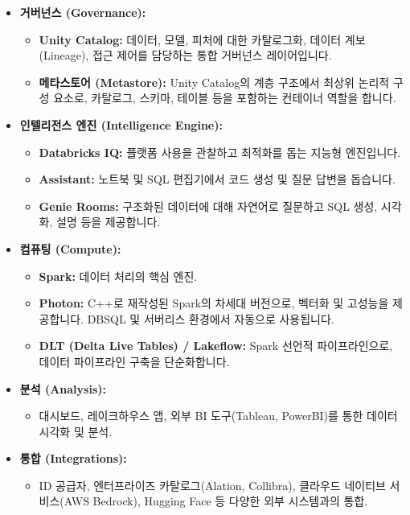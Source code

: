 \documentclass[11pt,a4paper]{article}
\begin{document}
\begin{itemize}
\begin{itemize}
        \item \textbf{Marketplace:} 타사 데이터(날씨, 신용 정보 등)를 가져오는 방법.
    \end{itemize}
    \item \textbf{거버넌스 (Governance):}
    \begin{itemize}
        \item \textbf{Unity Catalog:} 데이터, 모델, 피처에 대한 카탈로그화, 데이터 계보(Lineage), 접근 제어를 담당하는 통합 거버넌스 레이어입니다.
        \item \textbf{메타스토어 (Metastore):} Unity Catalog의 계층 구조에서 최상위 논리적 구성 요소로, 카탈로그, 스키마, 테이블 등을 포함하는 컨테이너 역할을 합니다.
    \end{itemize}
    \item \textbf{인텔리전스 엔진 (Intelligence Engine):}
    \begin{itemize}
        \item \textbf{Databricks IQ:} 플랫폼 사용을 관찰하고 최적화를 돕는 지능형 엔진입니다.
        \item \textbf{Assistant:} 노트북 및 SQL 편집기에서 코드 생성 및 질문 답변을 돕습니다.
        \item \textbf{Genie Rooms:} 구조화된 데이터에 대해 자연어로 질문하고 SQL 생성, 시각화, 설명 등을 제공합니다.
    \end{itemize}
    \item \textbf{컴퓨팅 (Compute):}
    \begin{itemize}
        \item \textbf{Spark:} 데이터 처리의 핵심 엔진.
        \item \textbf{Photon:} C++로 재작성된 Spark의 차세대 버전으로, 벡터화 및 고성능을 제공합니다. DBSQL 및 서버리스 환경에서 자동으로 사용됩니다.
        \item \textbf{DLT (Delta Live Tables) / Lakeflow:} Spark 선언적 파이프라인으로, 데이터 파이프라인 구축을 단순화합니다.
    \end{itemize}
    \item \textbf{분석 (Analysis):}
    \begin{itemize}
        \item 대시보드, 레이크하우스 앱, 외부 BI 도구(Tableau, PowerBI)를 통한 데이터 시각화 및 분석.
    \end{itemize}
    \item \textbf{통합 (Integrations):}
    \begin{itemize}
        \item ID 공급자, 엔터프라이즈 카탈로그(Alation, Collibra), 클라우드 네이티브 서비스(AWS Bedrock), Hugging Face 등 다양한 외부 시스템과의 통합.
    \end{itemize}
\end{itemize}
\end{document}
